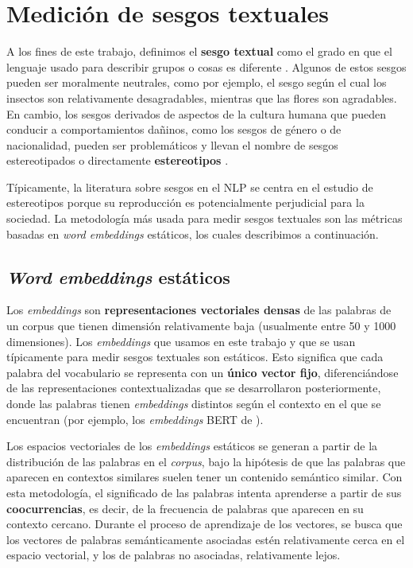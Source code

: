 
\chapter{Medición de sesgos textuales} \label{cap:sesgo_textos}

A los fines de este trabajo, definimos el \textbf{sesgo textual} como el grado en que el lenguaje usado para describir grupos o cosas es diferente \citep{hoyle2019unsupervised}. Algunos de estos sesgos pueden ser moralmente neutrales, como por ejemplo, el sesgo según el cual los insectos son relativamente desagradables, mientras que las flores son agradables. En cambio, los sesgos derivados de aspectos de la cultura humana que pueden conducir a comportamientos dañinos, como los sesgos de género o de nacionalidad, pueden ser problemáticos y llevan el nombre de sesgos estereotipados o directamente \textbf{estereotipos} \citep{caliskan2017semantics}. 

Típicamente, la literatura sobre sesgos en el NLP se centra en el estudio de estereotipos porque su reproducción es potencialmente perjudicial para la sociedad. La metodología más usada para medir sesgos textuales son las métricas basadas en \emph{word embeddings} estáticos, los cuales describimos a continuación.


\section{\emph{Word embeddings} estáticos} \label{sec:embeddings}

Los \emph{embeddings} son \textbf{representaciones vectoriales densas} de las palabras de un corpus que tienen dimensión relativamente baja (usualmente entre 50 y 1000 dimensiones). Los \emph{embeddings} que usamos en este trabajo y que se usan típicamente para medir sesgos textuales son estáticos. Esto significa que cada palabra del vocabulario se representa con un \textbf{único vector fijo}, diferenciándose de las representaciones contextualizadas que se desarrollaron posteriormente, donde las palabras tienen \emph{embeddings} distintos según el contexto en el que se encuentran (por ejemplo, los \emph{embeddings} BERT de \citealp{devlin2019bert}). 

Los espacios vectoriales de los \emph{embeddings} estáticos se generan a partir de la distribución de las palabras en el \emph{corpus}, bajo la hipótesis de que las palabras que aparecen en contextos similares suelen tener un contenido semántico similar. Con esta metodología, el significado de las palabras intenta aprenderse a partir de sus \textbf{coocurrencias}, es decir, de la frecuencia de palabras que aparecen en su contexto cercano. Durante el proceso de aprendizaje de los vectores, se busca que los vectores de palabras semánticamente asociadas estén relativamente cerca en el espacio vectorial, y los de palabras no asociadas, relativamente lejos. 

